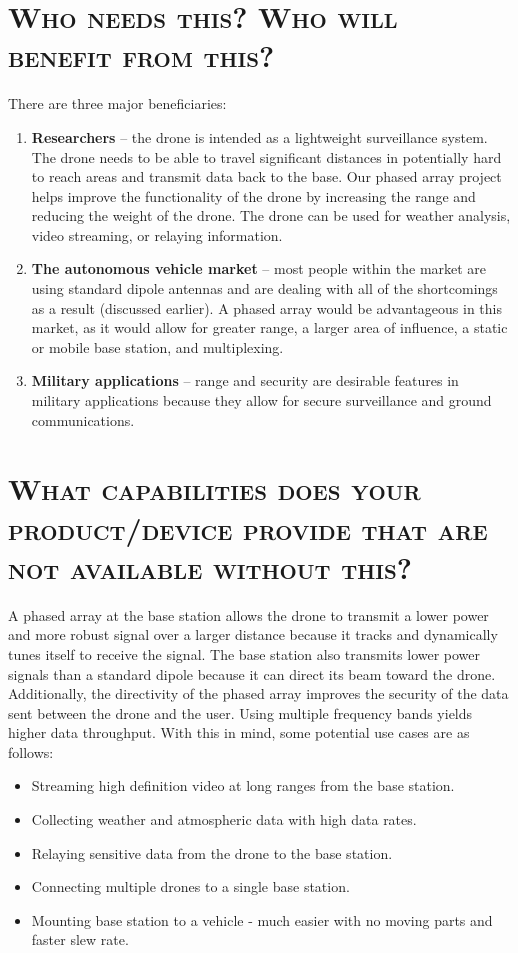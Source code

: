 \documentclass[11pt]{article}
\numberwithin{figure}{section}
\begin{document}
\section{\textsc{Who needs this? Who will benefit from this?}}
There are three major beneficiaries: 
	\begin{enumerate}
		\item \textbf{Researchers} -- the drone is intended as a lightweight surveillance system.  The drone needs to be able to travel significant distances in potentially hard to reach areas and transmit data back to the base.  Our phased array project helps improve the functionality of the drone by increasing the range and reducing the weight of the drone.  The drone can be used for weather analysis, video streaming, or relaying information.
		\item \textbf{The autonomous vehicle market} -- most people within the market are using standard dipole antennas and are dealing with all of the shortcomings as a result (discussed earlier).  A phased array would be advantageous in this market, as it would allow for greater range, a larger area of influence, a static or mobile base station, and multiplexing.
		\item \textbf{Military applications} -- range and security are desirable features in military applications because they allow for secure surveillance and ground communications.
	\end{enumerate}

\section{\textsc{What capabilities does your product/device provide that are not available without this?}}
A phased array at the base station allows the drone to transmit a lower power and more robust signal over a larger distance because it tracks and dynamically tunes itself to receive the signal.  The base station also transmits lower power signals than a standard dipole because it can direct its beam toward the drone.  Additionally, the directivity of the phased array improves the security of the data sent between the drone and the user.  Using multiple frequency bands yields higher data throughput.  With this in mind, some potential use cases are as follows:
	\begin{itemize}
		\item Streaming high definition video at long ranges from the base station.
		\item Collecting weather and atmospheric data with high data rates.
		\item Relaying sensitive data from the drone to the base station.
		\item Connecting multiple drones to a single base station.
		\item Mounting base station to a vehicle - much easier with no moving parts and faster slew rate.
	\end{itemize}
\end{document}
